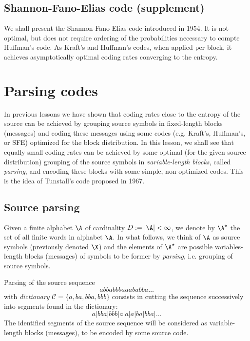 \documentclass[toc, titlepaged]{../cs-classes/cs-classes}
\begin{document}
\subsection{Shannon-Fano-Elias code (supplement)}
We shall present the Shannon-Fano-Elias code introduced in 1954. It is not optimal, but does not require ordering of the probabilities necessary to compte Huffman's code. As Kraft's and Huffman's codes, when applied per block, it achieves asymptotically optimal coding rates converging to the entropy.

\section{Parsing codes}
In previous lessons we have shown that coding rates close to the entropy of the source can be achieved by grouping source symbols in fixed-length blocks (messages) and coding these messages using some codes (e.g. Kraft's, Huffman's, or SFE) optimized for the block distribution. In this lesson, we shall see that equally small coding rates can be achieved by some optimal (for the given source distribution) grouping of the source symbols in \emph{variable-length blocks}, called \emph{parsing}, and encoding these blocks with some simple, non-optimized codes. This is the idea of Tunstall's code proposed in 1967.

\subsection{Source parsing}
Given a finite alphabet $\A$ of cardinality $D:=|\A|<\infty$, we denote by $\A^\star$ the set of all finite words in alphabet $\A$. In what follows, we think of $\A$ as source symbols (previously denoted $\X$) and the elements of $\A^\star$ are possible variables-length blocks (messages) of symbols to be former by \emph{parsing}, i.e. grouping of source symbols.

\begin{example}
    Parsing of the source sequence
    \begin{equation*}
        abbabbbaaababba\dots
    \end{equation*}
    with \emph{dictionary} $\mathcal{C} = \{a, ba, bba, bbb\}$ consists in cutting the sequence successively into segments found in the dictionary:
    \begin{equation*}
        a|bba|bbb|a|a|a|ba|bba|\dots
    \end{equation*}
    The identified segments of the source sequence will be considered as variable-length blocks (messages), to be encoded by some source code.
\end{example}
\end{document}
